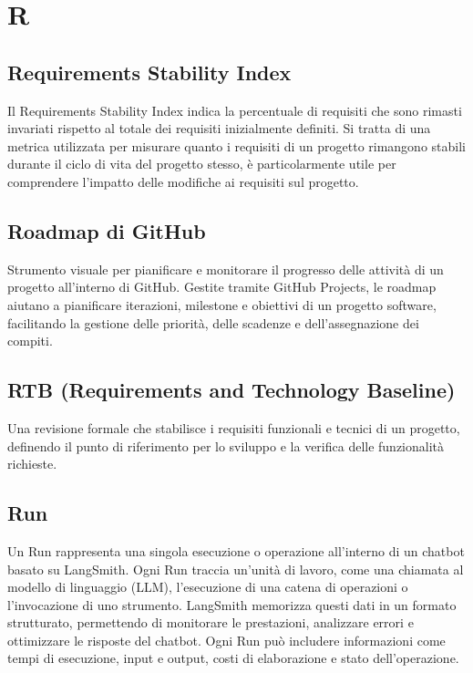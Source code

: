 \documentclass{article}
\begin{document}
\newpage

\section{R}

\subsection{Requirements Stability Index}
Il Requirements Stability Index indica la percentuale di requisiti che sono rimasti invariati rispetto al totale dei requisiti inizialmente definiti. Si tratta di una metrica utilizzata per misurare quanto i requisiti di un progetto rimangono stabili durante il ciclo di vita del progetto stesso, è particolarmente utile per comprendere l’impatto delle modifiche ai requisiti sul progetto.

\subsection{Roadmap di GitHub}
Strumento visuale per pianificare e monitorare il progresso delle attività di un progetto all'interno di GitHub. Gestite tramite GitHub Projects, le roadmap aiutano a pianificare iterazioni, milestone e obiettivi di un progetto software, facilitando la gestione delle priorità, delle scadenze e dell'assegnazione dei compiti.

\subsection{RTB (Requirements and Technology Baseline)}
Una revisione formale che stabilisce i requisiti funzionali e tecnici di un progetto, definendo il punto di riferimento per lo sviluppo e la verifica delle funzionalità richieste.

\subsection{Run}  
Un Run rappresenta una singola esecuzione o operazione all'interno di un chatbot basato su LangSmith. Ogni Run traccia un'unità di lavoro, come una chiamata al modello di linguaggio (LLM), l'esecuzione di una catena di operazioni o l'invocazione di uno strumento. LangSmith memorizza questi dati in un formato strutturato, permettendo di monitorare le prestazioni, analizzare errori e ottimizzare le risposte del chatbot. Ogni Run può includere informazioni come tempi di esecuzione, input e output, costi di elaborazione e stato dell'operazione.  
\end{document}
